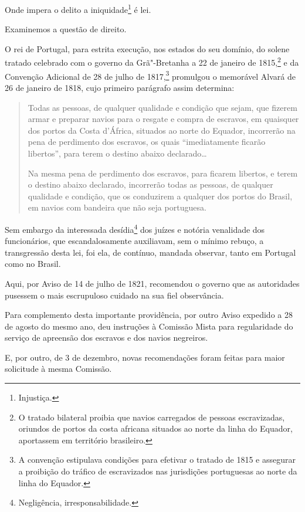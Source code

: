 Onde impera o delito a iniquidade\footnote{Injustiça.} é lei.

Examinemos a questão de direito.

O rei de Portugal, para estrita execução, nos estados do seu domínio, do
solene tratado celebrado com o governo da Grã"-Bretanha a 22 de janeiro
de 1815,\footnote{O tratado bilateral proibia que navios carregados de
  pessoas escravizadas, oriundos de portos da costa africana situados ao
  norte da linha do Equador, aportassem em território brasileiro.} e da
Convenção Adicional de 28 de julho de 1817,\footnote{A convenção
  estipulava condições para efetivar o tratado de 1815 e assegurar a
  proibição do tráfico de escravizados nas jurisdições portuguesas ao
  norte da linha do Equador.} promulgou o memorável Alvará de 26 de
janeiro de 1818, cujo primeiro parágrafo assim determina:

\begin{quote}
Todas as pessoas, de qualquer qualidade e condição que sejam, que
fizerem armar e preparar navios para o resgate e compra de escravos, em
quaisquer dos portos da Costa d'África, situados ao norte do Equador,
incorrerão na pena de perdimento dos escravos, os quais ``imediatamente
ficarão libertos'', para terem o destino abaixo declarado\ldots{}

Na mesma pena de perdimento dos escravos, para ficarem libertos, e terem
o destino abaixo declarado, incorrerão todas as pessoas, de qualquer
qualidade e condição, que os conduzirem a qualquer dos portos do Brasil,
em navios com bandeira que não seja portuguesa.
\end{quote}

\asterisc

Sem embargo da interessada desídia\footnote{Negligência,
  irresponsabilidade.} dos juízes e notória venalidade dos funcionários,
que escandalosamente auxiliavam, sem o mínimo rebuço, a transgressão
desta lei, foi ela, de contínuo, mandada observar, tanto em Portugal
como no Brasil.

Aqui, por Aviso de 14 de julho de 1821, recomendou o governo que as
autoridades pusessem o mais escrupuloso cuidado na sua fiel observância.

Para complemento desta importante providência, por outro Aviso expedido
a 28 de agosto do mesmo ano, deu instruções à Comissão Mista para
regularidade do serviço de apreensão dos escravos e dos navios
negreiros.

E, por outro, de 3 de dezembro, novas recomendações foram feitas para
maior solicitude à mesma Comissão.

